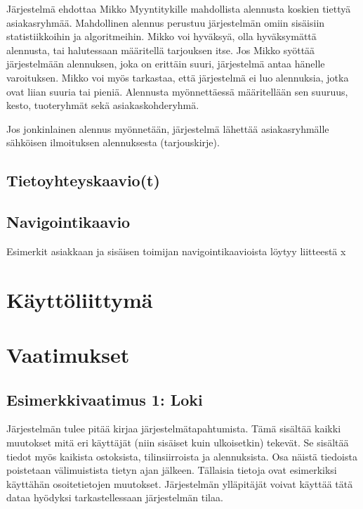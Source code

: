     Järjestelmä ehdottaa Mikko Myyntitykille mahdollista alennusta koskien tiettyä asiakasryhmää.
    Mahdollinen alennus perustuu järjestelmän omiin sisäisiin statistiikkoihin ja algoritmeihin.
    Mikko voi hyväksyä, olla hyväksymättä alennusta, tai halutessaan määritellä tarjouksen itse.
    Jos Mikko syöttää järjestelmään alennuksen, joka on erittäin suuri, järjestelmä antaa hänelle varoituksen.
    Mikko voi myös tarkastaa, että järjestelmä ei luo alennuksia, jotka ovat liian suuria tai pieniä.
    Alennusta myönnettäessä määritellään sen suuruus, kesto, tuoteryhmät sekä asiakaskohderyhmä.

    Jos jonkinlainen alennus myönnetään, järjestelmä lähettää asiakasryhmälle sähköisen ilmoituksen alennuksesta (tarjouskirje).

\subsection{Tietoyhteyskaavio(t)}   %


\subsection{Navigointikaavio}     %
    
    Esimerkit asiakkaan ja sisäisen toimijan navigointikaavioista löytyy liitteestä x   %

\section{Käyttöliittymä}  %



\section{Vaatimukset}       %

    \subsection{Esimerkkivaatimus 1: Loki}
        Järjestelmän tulee pitää kirjaa järjestelmätapahtumista. Tämä sisältää kaikki muutokset mitä eri käyttäjät (niin sisäiset kuin ulkoisetkin) tekevät.
        Se sisältää tiedot myös kaikista ostoksista, tilinsiirroista ja alennuksista. Osa näistä tiedoista poistetaan välimuistista tietyn ajan 
        jälkeen. Tällaisia tietoja ovat esimerkiksi käyttähän osoitetietojen muutokset. Järjestelmän ylläpitäjät voivat käyttää tätä dataa hyödyksi tarkastellessaan 
        järjestelmän tilaa. 
